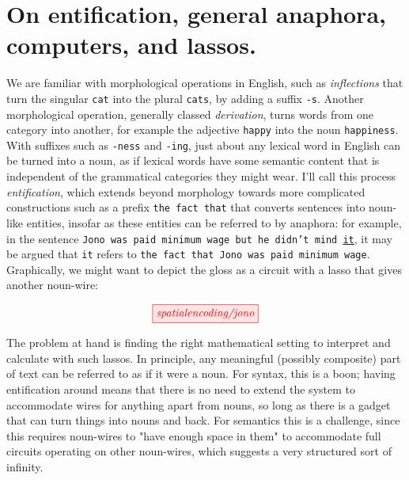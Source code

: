 \section{On entification, general anaphora, computers, and lassos.}

 We are familiar with morphological operations in English, such as \emph{inflections} that turn the singular \texttt{cat} into the plural \texttt{cats}, by adding a suffix \texttt{-s}. Another morphological operation, generally classed \emph{derivation}, turns words from one category into another, for example the adjective \texttt{happy} into the noun \texttt{happiness}. With suffixes such as \texttt{-ness} and \texttt{-ing}, just about any lexical word in English can be turned into a noun, as if lexical words have some semantic content that is independent of the grammatical categories they might wear. I'll call this process \emph{entification}, which extends beyond morphology towards more complicated constructions such as a prefix \texttt{the fact that} that converts sentences into noun-like entities, insofar as these entities can be referred to by anaphora: for example, in the sentence \texttt{Jono was paid minimum wage but he didn't mind \underline{it}}, it may be argued that \texttt{it} refers to \texttt{the fact that Jono was paid minimum wage}. Graphically, we might want to depict the gloss as a circuit with a lasso that gives another noun-wire:

\[\tikzfig{spatialencoding/jono}\]

 The problem at hand is finding the right mathematical setting to interpret and calculate with such lassos. In principle, any meaningful (possibly composite) part of text can be referred to as if it were a noun. For syntax, this is a boon; having entification around means that there is no need to extend the system to accommodate wires for anything apart from nouns, so long as there is a gadget that can turn things into nouns and back. For semantics this is a challenge, since this requires noun-wires to "have enough space in them" to accommodate full circuits operating on other noun-wires, which suggests a very structured sort of infinity.

